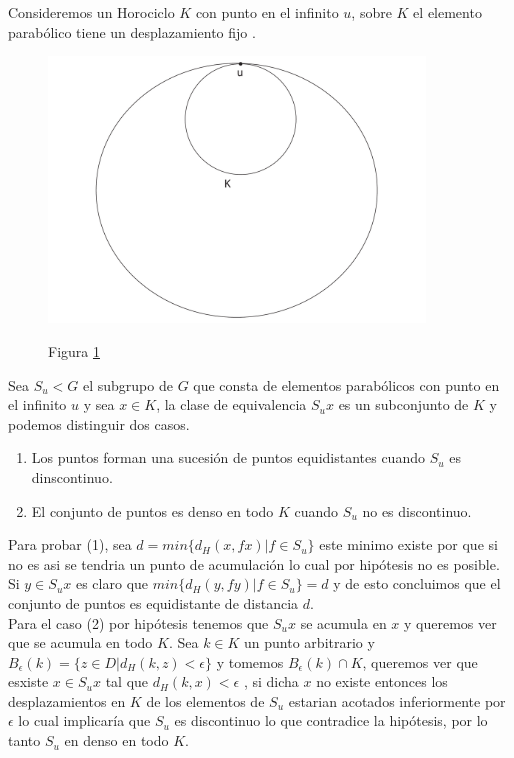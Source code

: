 Consideremos un Horociclo $K$ con punto en el infinito $u$, sobre $K$
el elemento parab\'olico tiene un desplazamiento fijo . \\

\begin{figure}[h]
  \centering
  \includegraphics[width=10cm]{lemma5-dibujo1}\\
  \caption{Figura \ref{lemma5-dibujo1}}\label{lemma5-dibujo1}
\end{figure}


Sea $S_{u} < G$ el subgrupo de $G$ que consta de elementos
parab\'olicos con punto en el infinito $u$ y sea $x \in K$, la clase
de equivalencia $S_{u}x$ es un subconjunto de $K$ y podemos
distinguir dos casos.

\begin{enumerate}
\item Los puntos forman una sucesi\'on de puntos equidistantes
cuando $S_{u}$ es dinscontinuo.

\item El conjunto de puntos es denso en todo $K$ cuando $S_{u}$ no
es discontinuo.
\end{enumerate}

Para probar (1), sea $d=min \lbrace d_{H}(x,fx) | f \in S_{u}
\rbrace$ este minimo existe por que si no es asi se tendria un punto
de acumulaci\'on lo cual por hip\'otesis no es posible. Si $y \in
S_{u}x $ es claro que $min \lbrace d_{H}(y,fy) | f \in S_{u} \rbrace
= d$ y de esto concluimos que el conjunto de puntos es equidistante
de distancia $d$. \\

Para el caso (2) por hip\'otesis tenemos que $S_{u}x$ se acumula en
$x$ y queremos ver que se acumula en todo $K$. Sea $k \in K$ un
punto arbitrario y $B_{\epsilon}(k)= \lbrace z \in D| d_{H}(k,z) < \epsilon
\rbrace$ y tomemos $B_{\epsilon}(k) \cap K$, queremos ver que esxiste $x
\in S_{u}x$ tal que $d_{H}(k,x) < \epsilon$ , si dicha $x$ no existe
entonces los desplazamientos  en $K$ de los elementos de $S_{u}$
estarian acotados inferiormente por $\epsilon$ lo cual implicar\'ia que
$S_{u}$ es discontinuo lo que contradice la hip\'otesis, por lo
tanto $S_{u}$ en denso en todo $K$. \\

